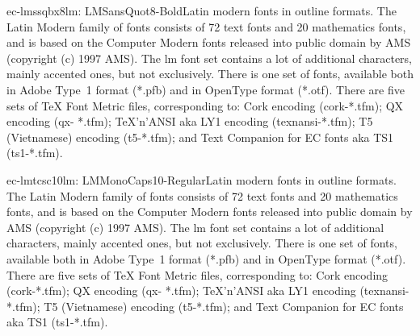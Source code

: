 \documentclass{ddltxtyp}
\begin{document}
\begin{package}{ec-lmssqbx8}{lm: LMSansQuot8-Bold}{Latin modern fonts in outline formats.}
The Latin Modern family of fonts consists of 72 text fonts and
20 mathematics fonts, and is based on the Computer Modern fonts
released into public domain by AMS (copyright (c) 1997 AMS).
The lm font set contains a lot of additional characters, mainly
accented ones, but not exclusively. There is one set of fonts,
available both in Adobe Type~1 format (*.pfb) and in OpenType
format (*.otf). There are five sets of {\TeX} Font Metric files,
corresponding to: Cork encoding (cork-*.tfm); QX encoding (qx-
*.tfm); {\TeX}'n'ANSI aka LY1 encoding (texnansi-*.tfm); T5
(Vietnamese) encoding (t5-*.tfm); and Text Companion for EC
fonts aka TS1 (ts1-*.tfm).
\end{package}
\begin{package}{ec-lmtcsc10}{lm: LMMonoCaps10-Regular}{Latin modern fonts in outline formats.}
The Latin Modern family of fonts consists of 72 text fonts and
20 mathematics fonts, and is based on the Computer Modern fonts
released into public domain by AMS (copyright (c) 1997 AMS).
The lm font set contains a lot of additional characters, mainly
accented ones, but not exclusively. There is one set of fonts,
available both in Adobe Type~1 format (*.pfb) and in OpenType
format (*.otf). There are five sets of {\TeX} Font Metric files,
corresponding to: Cork encoding (cork-*.tfm); QX encoding (qx-
*.tfm); {\TeX}'n'ANSI aka LY1 encoding (texnansi-*.tfm); T5
(Vietnamese) encoding (t5-*.tfm); and Text Companion for EC
fonts aka TS1 (ts1-*.tfm).
\end{package}
\end{document}
